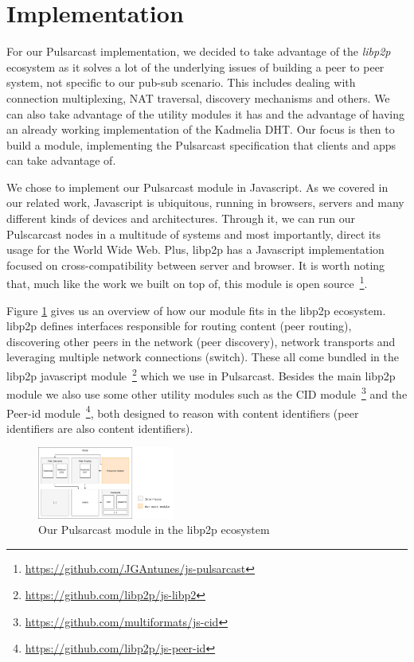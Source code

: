 
\section{Implementation}
\label{section:implementation}

For our Pulsarcast implementation, we decided to take advantage of the
\emph{libp2p} ecosystem as it solves a lot of the underlying issues of building
a peer to peer system, not specific to our pub-sub scenario. This includes
dealing with connection multiplexing, NAT traversal, discovery mechanisms and
others. We can also take advantage of the utility modules it has and the
advantage of having an already working implementation of the Kadmelia DHT. Our
focus is then to build a module, implementing the Pulsarcast specification that
clients and apps can take advantage of. 

We chose to implement our Pulsarcast module in Javascript. As we covered in our
related work, Javascript is ubiquitous, running in browsers, servers and many
different kinds of devices and architectures. Through it, we can run our
Pulscarcast nodes in a multitude of systems and most importantly, direct its
usage for the World Wide Web. Plus, libp2p has a Javascript implementation
focused on cross-compatibility between server and browser. It is worth
noting that, much like the work we built on top of, this module is open
source~\footnote{\url{https://github.com/JGAntunes/js-pulsarcast}}.

Figure \ref{fig:pulsarcast-in-libp2p} gives us an overview of how our module
fits in the libp2p ecosystem. libp2p defines interfaces responsible for routing
content (peer routing), discovering other peers in the network (peer
discovery), network transports and leveraging multiple network connections
(switch). These all come bundled in the libp2p javascript
module~\footnote{\url{https://github.com/libp2p/js-libp2}} which we use in
Pulsarcast. Besides the main libp2p module we also use some other utility
modules such as the CID
module~\footnote{\url{https://github.com/multiformats/js-cid}} and the Peer-id
module~\footnote{\url{https://github.com/libp2p/js-peer-id}}, both designed to
reason with content identifiers (peer identifiers are also content
identifiers). 

\begin{figure}[hb!]
  \centering
  \includegraphics[width=0.4\textwidth]{../images/pulsarcast-in-libp2p.png}
  \caption{Our Pulsarcast module in the libp2p ecosystem}
  \label{fig:pulsarcast-in-libp2p}
\end{figure}

